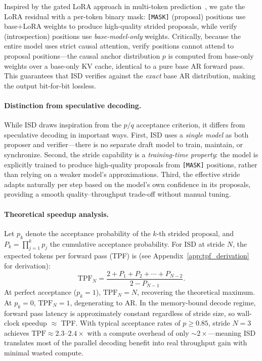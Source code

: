 Inspired by the gated LoRA approach in multi-token prediction~\citep{applemtp2025}, we gate the LoRA residual with a per-token binary mask: \texttt{[MASK]} (proposal) positions use base+LoRA weights to produce high-quality strided proposals, while verify (introspection) positions use \emph{base-model-only} weights. Critically, because the entire model uses strict causal attention, verify positions cannot attend to proposal positions---the causal anchor distribution $p$ is computed from base-only weights over a base-only KV cache, identical to a pure base AR forward pass. This guarantees that ISD verifies against the \emph{exact} base AR distribution, making the output bit-for-bit lossless.

\paragraph{Distinction from speculative decoding.}
While ISD draws inspiration from the $p/q$ acceptance criterion, it differs from speculative decoding in important ways. First, ISD uses a \emph{single model} as both proposer and verifier---there is no separate draft model to train, maintain, or synchronize. Second, the stride capability is a \emph{training-time property}: the model is explicitly trained to produce high-quality proposals from \texttt{[MASK]} positions, rather than relying on a weaker model's approximations. Third, the effective stride adapts naturally per step based on the model's own confidence in its proposals, providing a smooth quality--throughput trade-off without manual tuning.

\paragraph{Theoretical speedup analysis.}
Let $p_k$ denote the acceptance probability of the $k$-th strided proposal, and $P_k = \prod_{j=1}^{k} p_j$ the cumulative acceptance probability. For ISD at stride $N$, the expected tokens per forward pass (TPF) is (see Appendix~\ref{app:tpf_derivation} for derivation):
\begin{equation}
    \text{TPF}_N = \frac{2 + P_1 + P_2 + \cdots + P_{N-2}}{2 - P_{N-1}}.
    \label{eq:tpf}
\end{equation}
At perfect acceptance ($p_k = 1$), $\text{TPF}_N = N$, recovering the theoretical maximum. At $p_k = 0$, $\text{TPF}_N = 1$, degenerating to AR. In the memory-bound decode regime, forward pass latency is approximately constant regardless of stride size, so wall-clock speedup $\approx$ TPF. With typical acceptance rates of $p \geq 0.85$, stride $N{=}3$ achieves $\text{TPF} \approx 2.3\text{--}2.4\times$ with a compute overhead of only ${\sim}2\times$---meaning ISD translates most of the parallel decoding benefit into real throughput gain with minimal wasted compute. 

